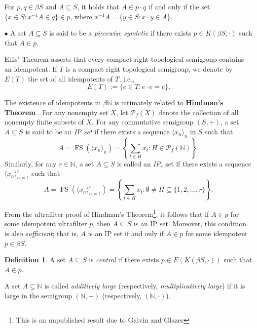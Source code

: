 \documentclass{article}
\theoremstyle{Theorem}
\theoremstyle{definition}
\newtheorem{defn}[thm]{Definition}
\begin{document}
For \( p, q \in \beta S \) and \( A \subseteq S \), it holds that \( A \in p \cdot q \) if and only if the set \( \{ x \in S : x^{-1}A \in q \} \in p \), where \( x^{-1}A = \{ y \in S : x \cdot y \in A \} \).

 \begin{center}
$\bullet$    A set $A\subseteq S$ is said to be a \emph{piecewise syndetic} if there exists $p\in K(\beta S,\cdot)$ such that $A\in p.$
\end{center}

Ellis' Theorem asserts that every compact right topological semigroup contains an idempotent. If \( T \) is a compact right topological semigroup, we denote by \( E(T) \) the set of all idempotents of \( T \), i.e., 
\[
E(T) := \{ e \in T : e \cdot e = e \}.
\]

The existence of idempotents in \( \beta \mathbb{N} \) is intimately related to \textbf{Hindman's Theorem} \cite{h}. For any nonempty set \( X \), let \( \mathcal{P}_f(X) \) denote the collection of all nonempty finite subsets of \( X \). For any commutative semigroup \( (S, +) \), a set \( A \subseteq S \) is said to be an \emph{IP set} if there exists a sequence \( \langle x_n \rangle_n \) in \( S \) such that
\[
A = \operatorname{FS}(\langle x_n \rangle_n) = \left\{ \sum_{t \in H} x_t : H \in \mathcal{P}_f(\mathbb{N}) \right\}.
\]
Similarly, for any \( r \in \mathbb{N} \), a set \( A \subseteq S \) is called an \emph{IP\(_r\)} set if there exists a sequence \( \langle x_n \rangle_{n=1}^r \) such that
\[
A = \operatorname{FS}(\langle x_n \rangle_{n=1}^r) = \left\{ \sum_{t \in H} x_t : \emptyset \neq H \subseteq \{1, 2, \ldots, r\} \right\}.
\]

From the ultrafilter proof of Hindman's Theorem\footnote{This is an unpublished result due to Galvin and Glazer}, it follows that if \( A \in p \) for some idempotent ultrafilter \( p \), then \( A \subseteq S \) is an IP set. Moreover, this condition is also \emph{sufficient}; that is, \( A \) is an IP set if and only if \( A \in p \) for some idempotent \( p \in \beta S \).


\begin{defn}
     A set $A\subseteq S$ is \emph{central} if there exists $p\in E\left(K(\beta S,\cdot)\right)$ such that $A\in p.$
\end{defn}
A set \( A \subseteq \mathbb{N} \) is called \emph{additively large} (respectively, \emph{multiplicatively large}) if it is large in the semigroup \( (\mathbb{N}, +) \) (respectively, \( (\mathbb{N}, \cdot) \)).
\end{document}
